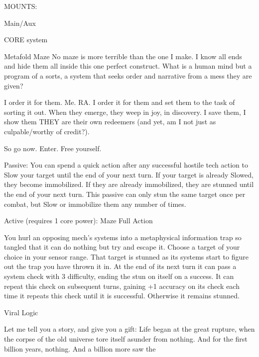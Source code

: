                                                    MOUNTS: 

 Main/Aux 

                                                 CORE system 

                                                                                                               


                                                 Metafold Maze  
 No maze is more terrible than the one I make. I know all ends and hide them all inside this one perfect  
 construct. What is a human mind but a program of a sorts, a system that seeks order and narrative from  
 a mess they are given?  

 I order it for them. Me. RA. I order it for them and set them to the task of sorting it out. When they  
 emerge, they weep in joy, in discovery. I save them, I show them THEY are their own redeemers (and  
 yet, am I not just as culpable/worthy of credit?).  

 So go now. Enter. Free yourself.       

  Passive: You can spend a quick action after any successful hostile tech action to Slow your target until 
 the end of your next turn. If your target is already Slowed, they become immobilized. If they are already 
  immobilized, they are stunned until the end of your next turn. This passive can only stun the same 
 target once per combat, but Slow or immobilize them any number of times. 

 Active (requires 1 core power): Maze  
  Full Action
 
 You hurl an opposing mech’s systems into a metaphysical information trap so tangled that it can do  
  nothing but try and escape it. Choose a target of your choice in your sensor range. That target is  
 stunned as its systems start to figure out the trap you have thrown it in. At the end of its next turn it can  
  pass a system check with 3 difficulty, ending the stun on itself on a success. It can repeat this check on  
 subsequent turns, gaining +1 accuracy on its check each time it repeats this check until it is successful.  
 Otherwise it remains stunned. 

Viral Logic
 

Let me tell you a story, and give you a gift: Life began at the great rupture, when the corpse of the old  
universe tore itself asunder from nothing. And for the first billion years, nothing. And a billion more saw the  

